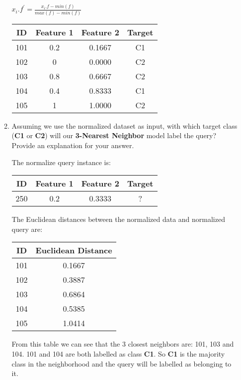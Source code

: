 \documentclass[--SOLUTION-OPTION--]{ditpaper}
\begin{document}
\begin{enumerate}
\begin{enumerate}
								\begin{center}
								$x_i.f^\prime=\frac{x_i.f - min(f)}{max(f)-min(f)}$
								\end{center}		
				\begin{answer}
					\begin{center}
\begin{tabular}{cccc}
\hline
ID & Feature 1 & Feature 2  & Target \\
\hline
101 &	0.2 &	 0.1667 &	C1\\
102 &	0    & 	0.0000 &	C2\\
103 &	0.8 & 	0.6667 &	C2\\
104 &	0.4 &	   0.8333 &	C1\\
105 &	1    & 	1.0000 &	C2\\
\hline
\end{tabular}
					\end{center}
				\end{answer}
			\item Assuming we use the normalized dataset as input, with which target class (\textbf{C1}  or \textbf{C2}) will our \textbf{3-Nearest Neighbor} model label the query? Provide an explanation for your answer.				
				\begin{answer}
					The normalize query instance is:
\begin{center}
\begin{tabular}{|c|c|c|c|}
\hline
ID & Feature 1 & Feature 
2  & Target \\
\hline
250 & 0.2 & 0.3333 & ?\\
\hline
\end{tabular}
\end{center}
				The Euclidean distances between the normalized data and normalized query are: 
					\begin{center}
						\begin{tabular}{|c|c|}
						ID & Euclidean Distance \\
						\hline
101	& 0.1667\\
102	& 0.3887\\
103	& 0.6864\\
104	& 0.5385\\
105	&1.0414\\						
\hline
						\end{tabular}
					\end{center}
From this table we can see that the 3 closest neighbors are: 101, 103 and 104. 101 and 104 are both labelled as class \textbf{C1}. So \textbf{C1} is the majority class in the neighborhood and the query will be labelled as belonging to it.					
				\end{answer}	
		\end{enumerate}
		

\end{enumerate}
\end{document}
